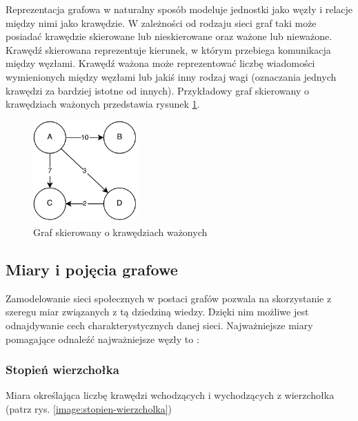 Reprezentacja grafowa w naturalny sposób modeluje jednostki jako węzły i relacje
między nimi jako krawędzie. W zależności od rodzaju sieci graf taki może
posiadać krawędzie skierowane lub nieskierowane oraz ważone lub nieważone.
Krawędź skierowana reprezentuje kierunek, w którym przebiega komunikacja między
węzłami. Krawędź ważona może reprezentować  liczbę wiadomości wymienionych
między węzłami lub jakiś inny rodzaj wagi (oznaczania jednych krawędzi
za bardziej istotne od innych). Przykładowy graf skierowany o krawędziach ważonych
przedstawia rysunek \ref{image:graf-skierowany}.

\begin{figure}[ht!]
\centering
\includegraphics[width=40mm]{img/graf-skierowany.png}
\caption{Graf skierowany o krawędziach ważonych}
\label{image:graf-skierowany}
\end{figure}

















\subsection{Miary i pojęcia grafowe}
Zamodelowanie sieci społecznych w postaci grafów pozwala na skorzystanie z szeregu
miar związanych z tą dziedziną wiedzy. Dzięki nim możliwe jest odnajdywanie cech
charakterystycznych danej sieci. Najważniejsze miary pomagające odnaleźć najważniejsze
węzły to \cite{estrada}: 


\subsubsection{Stopień wierzchołka}
Miara określająca liczbę krawędzi wchodzących i 
  wychodzących z wierzchołka (patrz rys. \ref{image:stopien-wierzcholka})
  
